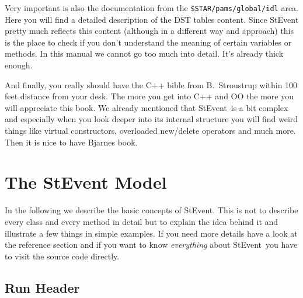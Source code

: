 \documentclass[twoside]{article}
\newcommand{\StEvent}{\textsf{StEvent}}
\begin{document}
Very important is also the documentation from the
\texttt{\$STAR/pams/global/idl} area. Here you will find a detailed
description of the DST tables content.  Since StEvent pretty much
reflects this content (although in a different way and approach) this
is the place to check if you don't understand the meaning of certain
variables or methods.  In this manual we cannot go too much into
detail. It's already thick enough.

And finally, you really should have the C++ bible from B.~Stroustrup
within 100 feet distance from your desk. The more you get into C++ and
OO the more you will appreciate this book. We already mentioned that
\StEvent\ is a bit complex and especially when you look deeper into
its internal structure you will find weird things like virtual
constructors, overloaded new/delete operators and much more.  Then it
is nice to have Bjarnes book.   \clearpage


\section{The StEvent Model} %

In the following we describe the basic concepts of \StEvent.  This is
not to describe every class and every method in detail but to explain
the idea behind it and illustrate a few things in simple examples.  If
you need more details have a look at the reference section and if you
want to know \emph{everything} about \StEvent\ you have to visit the
source code directly.

\subsection{Run Header}
   
\end{document}
